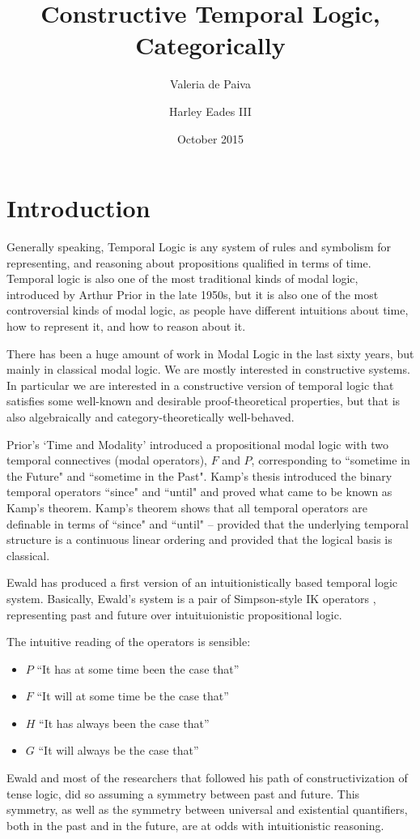 \documentclass{article}
\title{Constructive Temporal Logic, Categorically}
\author{Valeria de Paiva \and Harley Eades III}
\date{October 2015}
\begin{document}
\maketitle

\section{Introduction}
Generally speaking, Temporal Logic is any system of rules and
symbolism for representing, and reasoning about propositions qualified
in terms of time.  Temporal logic is also one of the most traditional
kinds of modal logic, introduced by Arthur Prior in the late 1950s,
but it is also one of the most controversial kinds of modal logic, as
people have different intuitions about time, how to represent it, and
how to reason about it.

There has been a huge amount of work in Modal Logic in the last sixty
years, but mainly in classical modal logic. We are mostly interested
in constructive systems. In particular we are interested in a
constructive version of temporal logic that satisfies some well-known
and desirable proof-theoretical properties, but that is also
algebraically and category-theoretically well-behaved.

Prior's `Time and Modality' introduced a propositional modal logic
with two temporal connectives (modal operators), $F$ and $P$,
corresponding to ``sometime in the {F}uture" and ``sometime in the
{P}ast". Kamp's thesis introduced the binary temporal operators
``since" and ``until" and proved what came to be known as Kamp's
theorem. Kamp's theorem shows that all temporal operators are
definable in terms of ``since" and ``until" -- provided that the
underlying temporal structure is a continuous linear ordering and
provided that the logical basis is classical.

Ewald \cite{ewald1986} has produced a first version of an
intuitionistically based temporal logic system. Basically, Ewald's
system is a pair of Simpson-style IK operators \cite{simpson1994},
representing past and future over intuituionistic propositional logic.

The intuitive reading of the operators is sensible:
\begin{itemize}
\item $P$ “It has at some time been the case that” 
\item $F$ “It will at some time be the case that” 
\item $H$ “It has always been the case that” 
\item $G$  “It will always be the case that” 
\end{itemize}
Ewald and most of the researchers that followed his path of
constructivization of tense logic, did so assuming a symmetry between
past and future. This symmetry, as well as the symmetry between
universal and existential quantifiers, both in the past and in the
future, are at odds with
intuitionistic reasoning.
\end{document}

